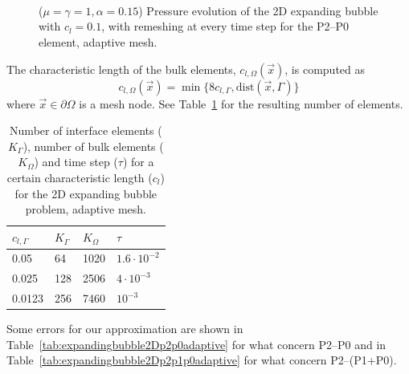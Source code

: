 \documentclass[a4paper,12pt,onecolumn]{article}
\begin{document}
\begin{figure}[htbp]
  \centering
  \\
  \quad
  \\
  \quad
  \\
  \caption{($\mu=\gamma=1,\alpha = 0.15$) Pressure evolution of the 2D expanding bubble with $c_l=0.1$, with remeshing at every time step for the P2--P0 element, adaptive mesh.}
  \label{fig:expanding_bubble_adaptive}
\end{figure}

The characteristic length of the bulk elements, $c_{l,\Omega}(\vec{x})$, is computed as
\begin{equation}\label{eq:adaptive_criteria}
 c_{l,\Omega}(\vec{x})=\min\big\{8c_{l,\Gamma},\textrm{dist}(\vec{x},\Gamma)\big\}
\end{equation}
where $\vec{x}\in\partial\Omega$ is a mesh node. See Table~\ref{tab:expandingbubble2Delements_adaptive} for the resulting number of elements. 
\begin{table}
 \center
\begin{tabular}{llll}
\hline
$c_{l,\Gamma}$ & $K_\Gamma$ & $K_\Omega$ & $\tau$ \\
\hline
0.05 & 64 & 1020 & $1.6\cdot10^{-2}$ \\
0.025 & 128 & 2506 & $4\cdot10^{-3}$\\
0.0123 & 256 & 7460 & $10^{-3}$\\
\hline
\end{tabular}
\caption{Number of interface elements ($K_\Gamma$), number of bulk elements ($K_\Omega$) and time step ($\tau$) for a certain characteristic length ($c_l$) for the 2D expanding bubble problem, adaptive mesh.}
\label{tab:expandingbubble2Delements_adaptive}
\end{table}

Some errors for our approximation are shown in Table~\ref{tab:expandingbubble2Dp2p0adaptive} for what concern P2--P0 and in Table~\ref{tab:expandingbubble2Dp2p1p0adaptive} for what concern P2--(P1+P0).
\end{document}
